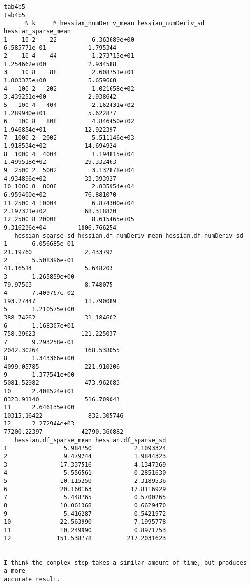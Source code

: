 \documentclass{article}
\newenvironment{revQuote}{\itshape}{\vspace{\baselineskip}}
\begin{document}
\begin{enumerate}
\begin{revQuote}
\begin{verbatim}
tab4b5
tab4b5
      N k     M hessian_numDeriv_mean hessian_numDeriv_sd
hessian_sparse_mean
1    10 2    22          6.363689e+00       
6.585771e-01            1.795344
2    10 4    44          1.273715e+01       
1.254662e+00            2.934588
3    10 8    88          2.608751e+01       
1.803375e+00            5.659668
4   100 2   202          1.021658e+02       
3.439251e+00            2.938642
5   100 4   404          2.162431e+02       
1.289940e+01            5.622877
6   100 8   808          4.846450e+02       
1.946854e+01           12.922397
7  1000 2  2002          5.511146e+03       
1.918534e+02           14.694924
8  1000 4  4004          1.194815e+04       
1.499518e+02           29.332463
9  2500 2  5002          3.132878e+04       
4.934896e+02           33.393927
10 1000 8  8008          2.835954e+04       
6.959400e+02           76.881070
11 2500 4 10004          6.874300e+04       
2.197321e+02           68.318820
12 2500 8 20008          8.615465e+05       
9.316236e+04         1806.766254
   hessian_sparse_sd hessian.df_numDeriv_mean hessian.df_numDeriv_sd
1       6.056685e-01                
21.19760               2.433792
2       5.508396e-01                
41.16514               5.648203
3       1.265859e+00                
79.97503               8.748075
4       7.409767e-02               
193.27447              11.790089
5       1.210575e+00               
388.74262              31.184602
6       1.168307e+01               
758.39623             121.225037
7       9.293258e-01              
2042.30264             168.538055
8       1.343366e+00              
4099.05785             221.910206
9       1.377541e+00              
5081.52982             473.962083
10      2.408524e+01              
8323.91140             516.709041
11      2.646135e+00             
10315.16422             832.305746
12      2.272944e+03             
77200.22397           42790.360882
   hessian.df_sparse_mean hessian.df_sparse_sd
1                5.984750            2.1093324
2                9.479244            1.9844323
3               17.337516            4.1347369
4                5.556561            0.2851630
5               10.115250            2.3189536
6               20.160163           17.8116929
7                5.448765            0.5700265
8               10.061368            0.6629470
9                5.416287            0.5421972
10              22.563990            7.1995778
11              10.249990            0.8971753
12             151.538778          217.2031623


I think the complex step takes a similar amount of time, but produces a more
accurate result.


\end{verbatim}
\end{revQuote}
\end{enumerate}
\end{document}
